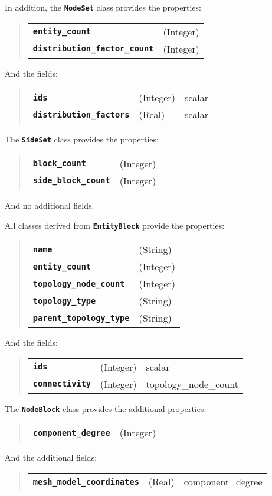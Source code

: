 \documentclass[11pt,twoside]{article}
\newcommand{\code}[1]
   {\mbox{\bf\tt #1}\null}
\begin{document}
In addition, the \code{NodeSet} class provides the properties:
\begin{quote}
\begin{tabular}{ll}
\code{entity\_count}         &(Integer) \\
\code{distribution\_factor\_count} &(Integer) \\
\end{tabular}
\end{quote}
And the fields:
\begin{quote}
\begin{tabular}{lll}
\code{ids}          & (Integer)  & scalar \\
\code{distribution\_factors} & (Real) & scalar \\
\end{tabular}
\end{quote}

The \code{SideSet} class provides the properties:
\begin{quote}
\begin{tabular}{ll}
\code{block\_count}         &(Integer) \\
\code{side\_block\_count} &(Integer) \\
\end{tabular}
\end{quote}
And no additional fields.

All classes derived from \code{EntityBlock} provide the properties:
\begin{quote}
\begin{tabular}{ll}
\code{name}                  &(String)  \\
\code{entity\_count}         &(Integer) \\
\code{topology\_node\_count} &(Integer) \\
\code{topology\_type}        &(String)  \\
\code{parent\_topology\_type}&(String)  \\
\end{tabular}
\end{quote}
And the fields:
\begin{quote}
\begin{tabular}{lll}
\code{ids}          & (Integer) & scalar \\ 
\code{connectivity} & (Integer) & topology\_node\_count \\
\end{tabular}
\end{quote}

The \code{NodeBlock} class provides the additional properties:
\begin{quote}
\begin{tabular}{ll}
\code{component\_degree}     &(Integer) \\
\end{tabular}
\end{quote}
And the additional fields:
\begin{quote}
\begin{tabular}{lll}
\code{mesh\_model\_coordinates}  & (Real) & component\_degree   \\
\end{tabular}
\end{quote}
\end{document}
